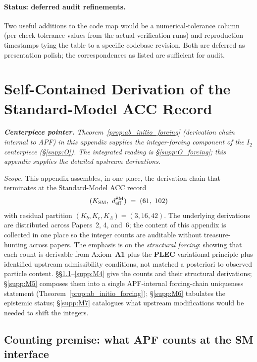 \documentclass[11pt]{article}
\theoremstyle{plain}
\theoremstyle{definition}
\theoremstyle{remark}
\newcommand{\Aone}{\textbf{A1}}
\newcommand{\PLEC}{\textbf{PLEC}}
\begin{document}
\paragraph{Status: deferred audit refinements.}  Two useful additions to the code map would be a numerical-tolerance column (per-check tolerance values from the actual verification runs) and reproduction timestamps tying the table to a specific codebase revision.  Both are deferred as presentation polish; the correspondences as listed are sufficient for audit.

\appendix
\section{Self-Contained Derivation of the Standard-Model ACC Record}\label{supp:M}

\noindent\textit{\textbf{Centerpiece pointer.}  Theorem~\ref{prop:ab_initio_forcing} (derivation chain internal to APF) in this appendix supplies the integer-forcing component of the $I_2$ centerpiece (\S\ref{supp:O}).  The integrated reading is \S\ref{supp:O_forcing}; this appendix supplies the detailed upstream derivations.}

\medskip

\noindent\textit{Scope.}  This appendix assembles, in one place, the derivation chain that terminates at the Standard-Model ACC record
\[
  (K_{\rm SM},\ d_{\rm eff}^{\rm SM}) \;=\; (61,\ 102)
\]
with residual partition $(K_b, K_c, K_\Lambda) = (3, 16, 42)$.  The underlying derivations are distributed across Papers~2, 4, and~6; the content of this appendix is collected in one place so the integer counts are auditable without treasure-hunting across papers.  The emphasis is on the \emph{structural forcing}: showing that each count is derivable from Axiom~\Aone{} plus the \PLEC{} variational principle plus identified upstream admissibility conditions, not matched a posteriori to observed particle content.  \S\S\ref{supp:M1}--\ref{supp:M4} give the counts and their structural derivations; \S\ref{supp:M5} composes them into a single APF-internal forcing-chain uniqueness statement (Theorem~\ref{prop:ab_initio_forcing}); \S\ref{supp:M6} tabulates the epistemic status; \S\ref{supp:M7} catalogues what upstream modifications would be needed to shift the integers.

\bigskip

\subsection{Counting premise: what APF counts at the SM interface}\label{supp:M1}
\end{document}
